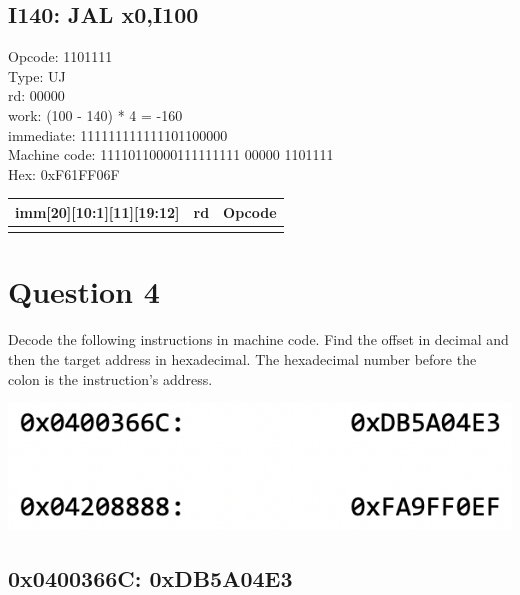 \documentclass{article}
\begin{document}
\subsection*{I140:   JAL x0,I100}

Opcode: 1101111\\
Type: UJ\\
rd: 00000\\
work: (100 - 140) * 4 = -160\\
immediate: 111111111111101100000\\
Machine code: 11110110000111111111 00000 1101111\\
Hex: 0xF61FF06F\\

\begin{center}
    \begin{tabularx}{1.15\textwidth} { 
        | >{\centering\arraybackslash}X 
        | >{\centering\arraybackslash}X 
        | >{\centering\arraybackslash}X | }
       \hline
        imm[20][10:1][11][19:12] & rd & Opcode \\
       \hline
       11110110000111111111 & 00000 & 1101111 \\
      \hline
    \end{tabularx}
\end{center}

\newpage

\section*{Question 4}

Decode the following instructions in machine code. Find the offset in decimal and then the
target address in hexadecimal. The hexadecimal number before the colon is the instruction’s
address.

\begin{center}
    \includegraphics[scale=.75]{images/Q4.png}
\end{center}

\subsection*{0x0400366C: 0xDB5A04E3}
\end{document}
